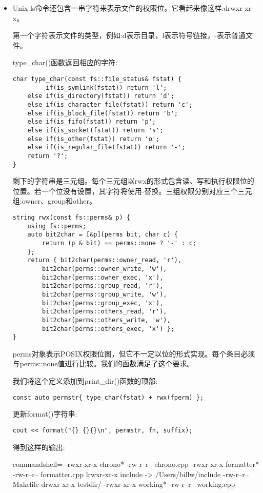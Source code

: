 \begin{itemize}
\item 
Unix ls命令还包含一串字符来表示文件的权限位。它看起来像这样:drwxr-xr-x。

第一个字符表示文件的类型，例如:d表示目录，l表示符号链接，-表示普通文件。

type\_char()函数返回相应的字符:

\begin{lstlisting}[style=styleCXX]
char type_char(const fs::file_status& fstat) {
		 if(is_symlink(fstat)) return 'l';
	else if(is_directory(fstat)) return 'd';
	else if(is_character_file(fstat)) return 'c';
	else if(is_block_file(fstat)) return 'b';
	else if(is_fifo(fstat)) return 'p';
	else if(is_socket(fstat)) return 's';
	else if(is_other(fstat)) return 'o';
	else if(is_regular_file(fstat)) return '-';
	return '?';
}
\end{lstlisting}

剩下的字符串是三元组。每个三元组以rwx的形式包含读、写和执行权限位的位置。若一个位没有设置，其字符将使用-替换。三组权限分别对应三个三元组:owner、group和other。

\begin{lstlisting}[style=styleCXX]
string rwx(const fs::perms& p) {
	using fs::perms;
	auto bit2char = [&p](perms bit, char c) {
		return (p & bit) == perms::none ? '-' : c;
	};
	return { bit2char(perms::owner_read, 'r'),
		bit2char(perms::owner_write, 'w'),
		bit2char(perms::owner_exec, 'x'),
		bit2char(perms::group_read, 'r'),
		bit2char(perms::group_write, 'w'),
		bit2char(perms::group_exec, 'x'),
		bit2char(perms::others_read, 'r'),
		bit2char(perms::others_write, 'w'),
		bit2char(perms::others_exec, 'x') };
}
\end{lstlisting}

perms对象表示POSIX权限位图，但它不一定以位的形式实现。每个条目必须与perms::none值进行比较。我们的函数满足了这个要求。

我们将这个定义添加到print\_dir()函数的顶部:

\begin{lstlisting}[style=styleCXX]
const auto permstr{ type_char(fstat) + rwx(fperm) };
\end{lstlisting}

更新format()字符串:

\begin{lstlisting}[style=styleCXX]
cout << format("{} {}{}\n", permstr, fn, suffix);
\end{lstlisting}

得到这样的输出:

\begin{tcblisting}{commandshell={}}
-rwxr-xr-x chrono*
-rw-r--r-- chrono.cpp
-rwxr-xr-x formatter*
-rw-r--r-- formatter.cpp
lrwxr-xr-x include -> /Users/billw/include
-rw-r--r-- Makefile
drwxr-xr-x testdir/
-rwxr-xr-x working*
-rw-r--r-- working.cpp
\end{tcblisting}


\end{itemize}
